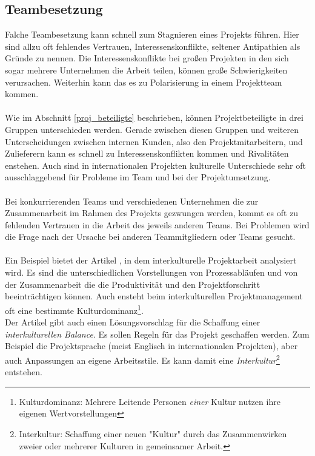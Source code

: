 \documentclass[11pt]{scrartcl}
\begin{document}
\subsection{Teambesetzung}
\label{teambesetz}
Falche Teambesetzung kann schnell zum Stagnieren eines Projekts führen. Hier sind allzu oft fehlendes Vertrauen, Interessenskonflikte, seltener Antipathien als Gründe zu nennen. Die Interessenskonflikte bei großen Projekten in den sich sogar mehrere Unternehmen die Arbeit teilen, können große Schwierigkeiten verursachen. Weiterhin kann das es zu Polarisierung in einem Projektteam kommen.\\
\\
Wie im Abschnitt \ref{proj_beteiligte} beschrieben, können Projektbeteiligte in drei Gruppen unterschieden werden. Gerade zwischen diesen Gruppen und weiteren Unterscheidungen zwischen internen Kunden, also den Projektmitarbeitern, und Zulieferern kann es schnell zu Interessenskonflikten kommen und Rivalitäten enstehen. Auch sind in internationalen Projekten kulturelle Unterschiede sehr oft ausschlaggebend für Probleme im Team und bei der Projektumsetzung.\\
\\
Bei konkurrierenden Teams und verschiedenen Unternehmen die zur Zusammenarbeit im Rahmen des Projekts gezwungen werden, kommt es oft zu fehlenden Vertrauen in die Arbeit des jeweils anderen Teams. Bei Problemen wird die Frage nach der Ursache bei anderen Teammitgliedern oder Teams gesucht. \\
\\
Ein Beispiel bietet der Artikel \cite{deu_franz_pm}, in dem interkulturelle Projektarbeit analysiert wird. Es sind die unterschiedlichen Vorstellungen von Prozessabläufen und von der Zusammenarbeit die die Produktivität und den Projektforschritt beeinträchtigen können. Auch ensteht beim interkulturellen Projektmanagement oft eine bestimmte Kulturdominanz\footnote{Kulturdominanz: Mehrere Leitende Personen \textit{einer} Kultur nutzen ihre eigenen Wertvorstellungen}.\\
Der Artikel gibt auch einen Lösungsvorschlag für die Schaffung einer \textit{interkulturellen Balance}. Es sollen Regeln für das Projekt geschaffen werden. Zum Beispiel die Projektsprache (meist Englisch in internationalen Projekten), aber auch Anpassungen an eigene Arbeitsstile. Es kann damit eine \textit{Interkultur}\footnote{Interkultur: Schaffung einer neuen "Kultur" durch das Zusammenwirken zweier oder mehrerer Kulturen in gemeinsamer Arbeit.} entstehen.
\end{document}
